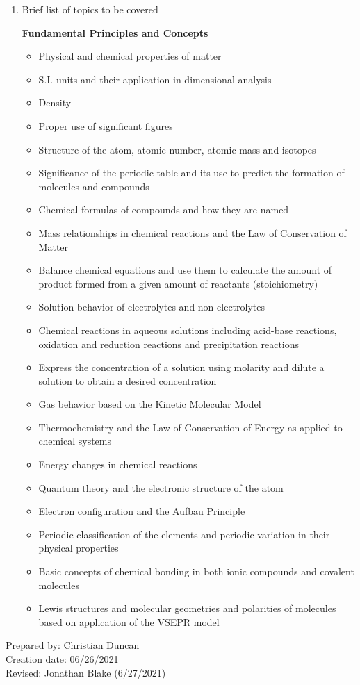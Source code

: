 \begin{enumerate}[1.]
\item Brief list of topics to be covered\\
  {\bfseries
    Fundamental Principles and Concepts
    \begin{itemize}
      \item Physical and chemical properties of matter
      \item S.I. units and their application in dimensional analysis
      \item Density
      \item Proper use of significant figures
      \item Structure of the atom, atomic number, atomic mass and isotopes
      \item Significance of the periodic table and its use to predict the formation of molecules and compounds
      \item Chemical formulas of compounds and how they are named
      \item Mass relationships in chemical reactions and the Law of Conservation of Matter
      \item Balance chemical equations and use them to calculate the amount of product formed from a given amount of reactants (stoichiometry)
      \item Solution behavior of electrolytes and non-electrolytes
      \item Chemical reactions in aqueous solutions including acid-base reactions, oxidation and reduction reactions and precipitation reactions
      \item Express the concentration of a solution using molarity and dilute a solution to obtain a desired concentration
      \item Gas behavior based on the Kinetic Molecular Model
      \item Thermochemistry and the Law of Conservation of Energy as applied to chemical systems
      \item Energy changes in chemical reactions
      \item Quantum theory and the electronic structure of the atom
      \item Electron configuration and the Aufbau Principle
      \item Periodic classification of the elements and periodic variation in their physical properties
      \item Basic concepts of chemical bonding in both ionic compounds and covalent molecules
      \item Lewis structures and molecular geometries and polarities of molecules based on application of the VSEPR model
    \end{itemize}
  }

\end{enumerate}

\noindent Prepared by: Christian Duncan\\
\noindent Creation date: 06/26/2021\\
\noindent Revised: Jonathan Blake (6/27/2021)\\

